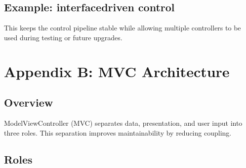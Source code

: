 \documentclass[letterpaper,10pt,english]{sphinxmanual}
\begin{document}
\section{Example: interface\sphinxhyphen{}driven control}
\label{\detokenize{appendix_a_object_oriented_programming:example-interface-driven-control}}
\begin{sphinxVerbatim}[commandchars=\\\{\}]
      
         

      
           

  
      
\end{sphinxVerbatim}

\sphinxAtStartPar
This keeps the control pipeline stable while allowing multiple controllers to
be used during testing or future upgrades.


\chapter{Appendix B: MVC Architecture}
\label{\detokenize{appendix_b_mvc_architecture:appendix-b-mvc-architecture}}\label{\detokenize{appendix_b_mvc_architecture::doc}}

\section{Overview}
\label{\detokenize{appendix_b_mvc_architecture:overview}}
\sphinxAtStartPar
Model\sphinxhyphen{}View\sphinxhyphen{}Controller (MVC) separates data, presentation, and user input into
three roles. This separation improves maintainability by reducing coupling.


\section{Roles}
\label{\detokenize{appendix_b_mvc_architecture:roles}}
\end{document}
